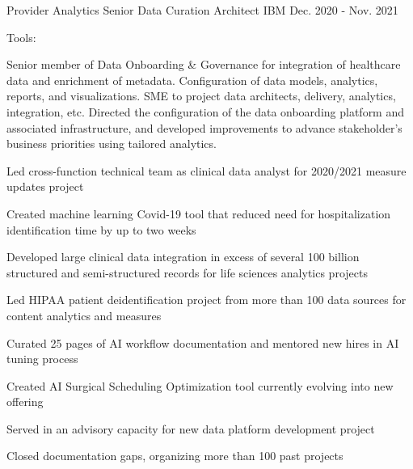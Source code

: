 \begin{cventries}
  \cvexpentry
    {Provider Analytics} %
    {Senior Data Curation Architect} %
    {IBM}
    {Dec. 2020 - Nov. 2021}
    {
      \begin{cvheavyparagraph}
        Tools:
      \end{cvheavyparagraph}
    }
    {
      \begin{cvparagraph}
        Senior member of Data Onboarding \& Governance for integration of healthcare data and enrichment of metadata. Configuration of data models, analytics, reports, and visualizations. SME to project data architects, delivery, analytics, integration, etc. Directed the configuration of the data onboarding platform and associated infrastructure, and developed improvements to advance stakeholder’s business priorities using tailored analytics.
      \end{cvparagraph}
      \begin{cvitems} %
        \item {Led cross-function technical team as clinical data analyst for 2020/2021 measure updates project}
        \item {Created machine learning Covid-19 tool that reduced need for hospitalization identification time by up to two weeks}
        \item {Developed large clinical data integration in excess of several 100 billion structured and semi-structured records for life sciences analytics projects}
        \item {Led HIPAA patient deidentification project from more than 100 data sources for content analytics and measures}
        \item {Curated 25 pages of AI workflow documentation and mentored new hires in AI tuning process}
        \item {Created AI Surgical Scheduling Optimization tool currently evolving into new offering}
        \item {Served in an advisory capacity for new data platform development project}
        \item {Closed documentation gaps, organizing more than 100 past projects}
      \end{cvitems}
    }


\end{cventries}
